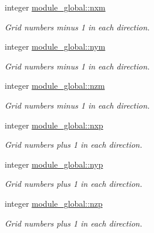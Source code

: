\textbf{ }\par
\begin{DoxyCompactItemize}
\item 
integer \mbox{\hyperlink{namespacemodule__global_ae76c3b71a1e513d542e7c22fbba06dd5}{module\+\_\+global\+::nxm}}
\begin{DoxyCompactList}\small\item\em Grid numbers minus 1 in each direction. \end{DoxyCompactList}\item 
integer \mbox{\hyperlink{namespacemodule__global_abe5a3dedbee692c61acb0614f80d7584}{module\+\_\+global\+::nym}}
\begin{DoxyCompactList}\small\item\em Grid numbers minus 1 in each direction. \end{DoxyCompactList}\item 
integer \mbox{\hyperlink{namespacemodule__global_a267d58e2cb3e1d5869114102f99fa203}{module\+\_\+global\+::nzm}}
\begin{DoxyCompactList}\small\item\em Grid numbers minus 1 in each direction. \end{DoxyCompactList}\end{DoxyCompactItemize}

\textbf{ }\par
\begin{DoxyCompactItemize}
\item 
integer \mbox{\hyperlink{namespacemodule__global_a46d777f91db627ffda250b59c2ace26f}{module\+\_\+global\+::nxp}}
\begin{DoxyCompactList}\small\item\em Grid numbers plus 1 in each direction. \end{DoxyCompactList}\item 
integer \mbox{\hyperlink{namespacemodule__global_ac5231664c2f5fe4f769a06df674e4292}{module\+\_\+global\+::nyp}}
\begin{DoxyCompactList}\small\item\em Grid numbers plus 1 in each direction. \end{DoxyCompactList}\item 
integer \mbox{\hyperlink{namespacemodule__global_a8ceb9b0d81231e3a40bfc849fd7b2a4f}{module\+\_\+global\+::nzp}}
\begin{DoxyCompactList}\small\item\em Grid numbers plus 1 in each direction. \end{DoxyCompactList}\end{DoxyCompactItemize}

